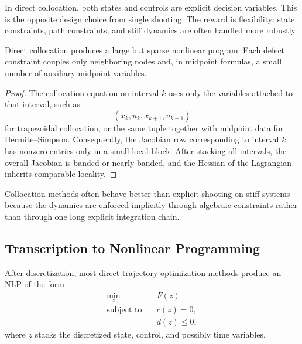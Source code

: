 \begin{remark}
	In direct collocation, both states and controls are explicit decision variables. This is the opposite design choice from single shooting. The reward is flexibility: state constraints, path constraints, and stiff dynamics are often handled more robustly.
\end{remark}

\begin{proposition}\label{prop:l5-sparsity-of-direct-collocation-nlps}
	Direct collocation produces a large but sparse nonlinear program. Each defect constraint couples only neighboring nodes and, in midpoint formulas, a small number of auxiliary midpoint variables.
\end{proposition}
\begin{proof}
	The collocation equation on interval $k$ uses only the variables attached to that interval, such as
	\[
		(x_k,u_k,x_{k+1},u_{k+1})
	\]
	for trapezoidal collocation, or the same tuple together with midpoint data for Hermite--Simpson. Consequently, the Jacobian row corresponding to interval $k$ has nonzero entries only in a small local block. After stacking all intervals, the overall Jacobian is banded or nearly banded, and the Hessian of the Lagrangian inherits comparable locality.
\end{proof}

\begin{remark}
	Collocation methods often behave better than explicit shooting on stiff systems because the dynamics are enforced implicitly through algebraic constraints rather than through one long explicit integration chain.
\end{remark}

\subsection{Transcription to Nonlinear Programming}
\label{sec:l5-transcription-to-nonlinear-programming}

\begin{definition}\label{def:l5-general-nlp-form-from-direct-transcription}
	After discretization, most direct trajectory-optimization methods produce an NLP of the form
	\begin{align*}
		\min_{z} \quad & F(z) \\
		\text{subject to}\quad & c(z)=0, \\
		                       & d(z)\le 0,
	\end{align*}
	where $z$ stacks the discretized state, control, and possibly time variables.
\end{definition}

